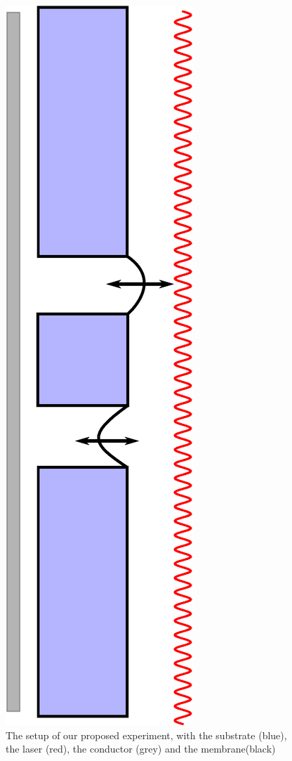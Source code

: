 \begin{figure}
  \centering
  \includegraphics[width=0.3\columnwidth]{Figures/Fuck_dig_christoffer.eps}
  \caption{The setup of our proposed experiment, with the substrate (blue), the laser (red), the conductor (grey) and the membrane(black)}
  \label{FDC}
\end{figure}